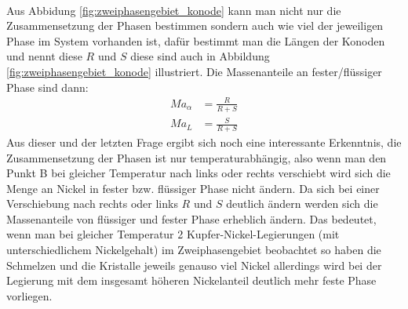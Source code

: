 \documentclass[11pt,a4paper]{article}
\numberwithin{equation}{section}
\numberwithin{figure}{section}
\begin{document}
\\
\begin{addmargin}[25pt]{0pt}
Aus Abbidung \ref{fig:zweiphasengebiet_konode} kann man nicht nur die Zusammensetzung der Phasen bestimmen sondern auch wie viel der jeweiligen Phase im System vorhanden ist, dafür bestimmt man die Längen der Konoden und nennt diese $R$ und $S$ diese sind auch in Abbildung \ref{fig:zweiphasengebiet_konode} illustriert. Die Massenanteile an fester/flüssiger Phase sind dann:
\begin{align}
    Ma_\alpha &= \frac{R}{R+S}\\
    Ma_L &= \frac{S}{R+S}
\end{align}
Aus dieser und der letzten Frage ergibt sich noch eine interessante Erkenntnis, die Zusammensetzung der Phasen ist nur temperaturabhängig, also wenn man den Punkt B bei gleicher Temperatur nach links oder rechts verschiebt wird sich die Menge an Nickel in fester bzw. flüssiger Phase nicht ändern. Da sich bei einer Verschiebung nach rechts oder links $R$ und $S$ deutlich ändern werden sich die Massenanteile von flüssiger und fester Phase erheblich ändern. Das bedeutet, wenn man bei gleicher Temperatur 2 Kupfer-Nickel-Legierungen (mit unterschiedlichem Nickelgehalt) im Zweiphasengebiet beobachtet so haben die Schmelzen und die Kristalle jeweils genauso viel Nickel allerdings wird bei der Legierung mit dem insgesamt höheren Nickelanteil deutlich mehr feste Phase vorliegen.\\  
\end{addmargin}
\end{document}
